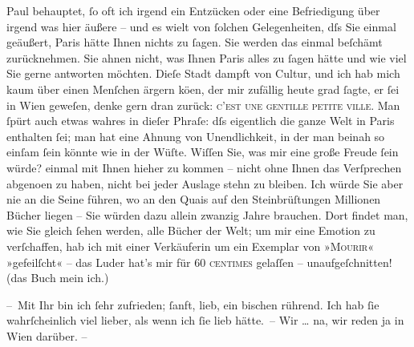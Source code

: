 \pstart
           Paul behauptet,{ }ſo oft ich irgend ein
               Entzücken oder eine Befriedigung über irgend was hier äußere – und es wi{\geminationm}elt von{ }ſolchen Gelegenheiten, dſs Sie einmal ge{\pb}äußert, Paris
               hätte Ihnen nichts zu{ }ſagen. Sie werden das einmal beſchämt zurücknehmen. Sie ahnen
               nicht, was Ihnen Paris alles zu{ }ſagen hätte und
               wie viel Sie gerne antworten möchten. Dieſe Stadt dampft von Cultur, und ich hab mich
               kaum über einen Menſchen ärgern kö{\geminationn}en, der mir zufällig
               heute grad{ }ſagte, er{ }ſei in Wien geweſen, {\pb}denke gern dran zurück: \textsc{c’est une
                  gentille petite ville}. Man{ }ſpürt auch etwas wahres in dieſer Phraſe: dſs
               eigentlich die ganze Welt in Paris enthalten{ }ſei;
               man hat eine Ahnung von Unendlichkeit, in der man beinah so einſam{ }ſein könnte wie in
               der Wüſte. Wiſſen Sie, was mir eine große Freude{ }ſein würde? einmal mit Ihnen hieher
               zu kommen – nicht {\pb}ohne Ihnen das Verſprechen abgeno{\geminationm}en zu haben, nicht bei jeder Auslage stehn zu bleiben.
               Ich würde Sie aber nie an die Seine führen, wo an den Quais auf den Steinbrüſtungen
               Millionen Bücher liegen – Sie würden dazu allein zwanzig Jahre brauchen. Dort findet
               man, wie Sie gleich{ }ſehen werden, alle Bücher der Welt; {\pb}um mir eine Emotion zu verſchaffen, hab ich mit einer
               Verkäuferin um ein Exemplar von »\textsc{Mourir}« »gefeilſcht« – das Luder hat’s mir für 60 \textsc{centimes}
               gelaſſen – unaufgeſchnitten! (das Buch mein ich.)\pend
           
\pstart
           – Mit Ihr bin ich{ }ſehr
               zufrieden;{ }ſanft, lieb, ein bischen rührend. Ich hab{ }ſie wahrſcheinlich viel lieber,
               als wenn ich{ }ſie lieb hätte. – Wir {\dots} na, wir reden ja in
                  Wien darüber. –\pend
           
